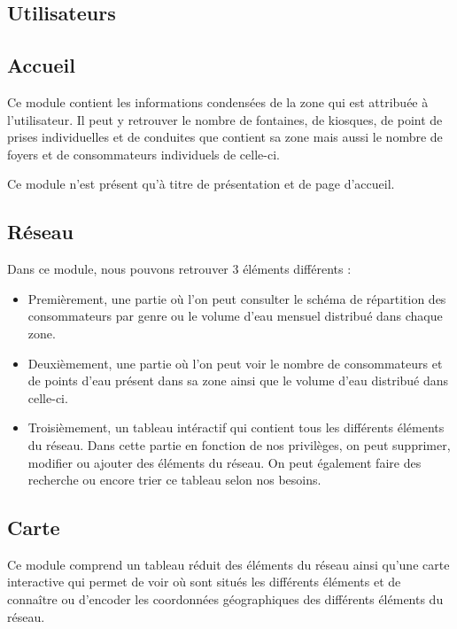 \documentclass{EPL-master-thesis-covers-FR}
\begin{document}
			\subsection{Utilisateurs}
				
			\subsection{Accueil}
				Ce module contient les informations condensées de la zone qui est attribuée à l'utilisateur. Il peut y retrouver le nombre de fontaines, de kiosques, de point de prises individuelles et de conduites que contient sa zone mais aussi le nombre de foyers et de consommateurs individuels de celle-ci. 
				
				Ce module n'est présent qu'à titre de présentation et de page d'accueil.
				
				
			\subsection{Réseau}
				Dans ce module, nous pouvons retrouver 3 éléments différents :
				\begin{itemize}
					\item Premièrement, une partie où l'on peut consulter le schéma de répartition des consommateurs par genre ou le volume d'eau mensuel distribué dans chaque zone.
					\item Deuxièmement, une partie où l'on peut voir le nombre de consommateurs et de points d'eau présent dans sa zone ainsi que le volume d'eau distribué dans celle-ci.
					\item Troisièmement, un tableau intéractif qui contient tous les différents éléments du réseau. Dans cette partie en fonction de nos privilèges, on peut supprimer, modifier ou ajouter des éléments du réseau. On peut également faire des recherche ou encore trier ce tableau selon nos besoins.
				\end{itemize}
				
			\subsection{Carte}
				Ce module comprend un tableau réduit des éléments du réseau ainsi qu'une carte interactive qui permet de voir où sont situés les différents éléments et de connaître ou d'encoder les coordonnées géographiques des différents éléments du réseau.
				
\end{document}
